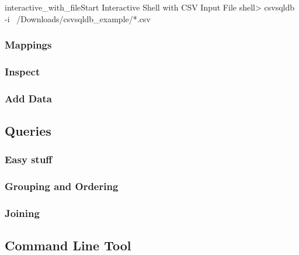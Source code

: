 \begin{ShellListing}{interactive_with_file}{Start Interactive Shell with CSV Input File}
shell> csvsqldb -i ~/Downloads/csvsqldb_example/*.csv
\end{ShellListing}

\subsubsection{Mappings}

\subsubsection{Inspect}

\subsubsection{Add Data}

\subsection{Queries}

\subsubsection{Easy stuff}

\subsubsection{Grouping and Ordering}


\subsubsection{Joining}

\subsection{Command Line Tool}

